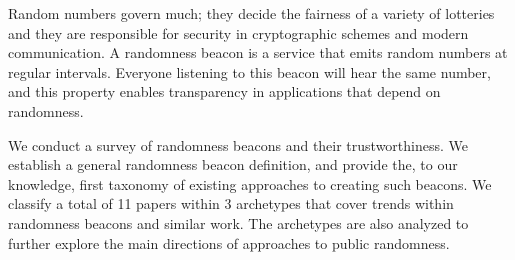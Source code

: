 Random numbers govern much;  they decide the fairness of a variety of lotteries and they are responsible for security in cryptographic schemes and modern communication. A randomness beacon is a service that emits random numbers at regular intervals. Everyone listening to this beacon will hear the same number, and this property enables transparency in applications that depend on randomness.%

We conduct a survey of randomness beacons and their trustworthiness. We establish a general randomness beacon definition, and provide the, to our knowledge, first taxonomy of existing approaches to creating such beacons. We classify a total of 11 papers within 3 archetypes that cover trends within randomness beacons and similar work. The archetypes are also analyzed to further explore the main directions of approaches to public randomness.
